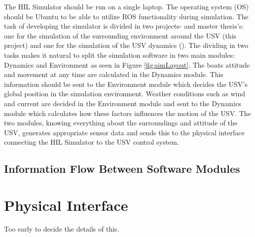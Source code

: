 The HIL Simulator should be run on a single laptop. The operating system (OS) should be Ubuntu to be able to utilize ROS functionality during simulation. The task of developing the simulator is divided in two projects- and master thesis's: one for the simulation of the surrounding environment around the USV (this project) and one for the simulation of the USV dynamics (\cite{even}). The dividing in two tasks makes it natural to split the simulation software in two main modules: Dynamics and Environment as seen in Figure \ref{fig:simLayout}. The boats attitude and movement at any time are calculated in the Dynamics module. This information should be sent to the Environment module which decides the USV's global position in the simulation environment. Weather conditions such as wind and current are decided in the Environment module and sent to the Dynamics module which calculates how these factors influences the motion of the USV. The two modules, knowing everything about the surroundings and attitude of the USV, generates appropriate sensor data and sends this to the physical interface connecting the HIL Simulator to the USV control system. 

\subsection{Information Flow Between Software Modules}


\section{Physical Interface}
Too early to decide the details of this.

